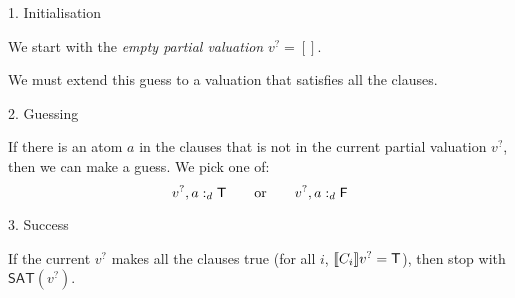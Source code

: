\documentclass[xetex,aspectratio=169,14pt,hyperref={pdfpagelabels=true,pdflang={en-GB}}]{beamer}
\begin{document}
\begin{frame}
  {1. Initialisation}

  We start with the \emph{empty partial valuation} $v^? = []$.\\

  \medskip

  We must extend this guess to a valuation that satisfies all the clauses.

\end{frame}

\begin{frame}
  {2. Guessing}

  If there is an atom $a$ in the clauses that is not in the current
  partial valuation $v^?$, then we can make a guess. We pick one of:
  \begin{displaymath}
    v^?, a :_d \mathsf{T} \qquad \textrm{or} \qquad v^?, a :_d \mathsf{F}
  \end{displaymath}

\end{frame}

\begin{frame}
  {3. Success}

  If the current $v^?$ makes all the clauses true (for all $i$,
  $\llbracket C_i \rrbracket v^? = \mathsf{T}$), then stop with $\mathsf{SAT}(v^?)$.
\end{frame}

\def\doneafter<#1>#2{%
  \temporal<#1>%
  {\colorbox{white}{\color{black}$\displaystyle#2$}}%
  {\colorbox{green!50}{\color{black}$\displaystyle#2$}}%
  {\colorbox{green!50}{\color{black}$\displaystyle#2$}}}

\def\stuck<#1>#2{%
  \temporal<#1>%
  {\colorbox{white}{\color{black}$\displaystyle#2$}}%
  {\colorbox{red!50}{\color{black}$\displaystyle#2$}}%
  {\colorbox{white}{\color{black}$\displaystyle#2$}}}

\def\done<#1>#2{%
  \temporal<#1>%
  {\colorbox{white}{\color{black}$\displaystyle#2$}}%
  {\colorbox{green!50}{\color{black}$\displaystyle#2$}}%
  {\colorbox{white}{\color{black}$\displaystyle#2$}}}

\newcommand{\undet}[1]{\stackrel{\textcolor{white}{\checkmark}}{\colorbox{white}{$#1$}}}
\newcommand{\failed}[1]{\stackrel{\times}{\colorbox{red!90}{\textcolor{white}{$#1$}}}}
\newcommand{\satd}[1]{\stackrel{\checkmark}{\colorbox{green!50}{{$#1$}}}}
\end{document}
